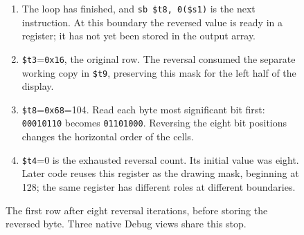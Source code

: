 \begin{figure}[htbp]
  \par\smallskip
  \begin{minipage}{\linewidth}
    \small
    \begin{enumerate}
      \item The loop has finished, and \texttt{sb \$t8, 0(\$s1)} is the next instruction. At this boundary the reversed value is ready in a register; it has not yet been stored in the output array.
      \item \texttt{\$t3}=\texttt{0x16}, the original row. The reversal consumed the separate working copy in \texttt{\$t9}, preserving this mask for the left half of the display.
      \item \texttt{\$t8}=\texttt{0x68}=104. Read each byte most significant bit first: \texttt{00010110} becomes \texttt{01101000}. Reversing the eight bit positions changes the horizontal order of the cells.
      \item \texttt{\$t4}=0 is the exhausted reversal count. Its initial value was eight. Later code reuses this register as the drawing mask, beginning at 128; the same register has different roles at different boundaries.
    \end{enumerate}
  \end{minipage}
  \caption{The first row after eight reversal iterations, before storing the reversed byte. Three native Debug views share this stop.}
  \label{capture:003-eight-byte-sprite-f02-reversal}
\end{figure}
\par
